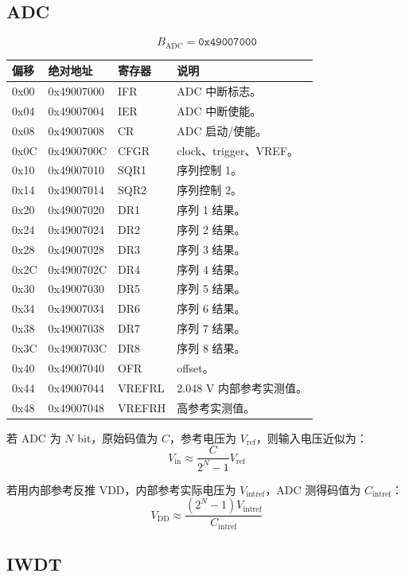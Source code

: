 \documentclass[UTF8,a4paper,11pt]{ctexart}
\newcommand{\addr}[1]{\texttt{#1}}
\begin{document}
\subsection{ADC}

\[
  B_{\mathrm{ADC}} = \addr{0x49007000}
\]

\begin{longtable}{>{\ttfamily}p{2cm}>{\ttfamily}p{3cm}p{2.5cm}p{6cm}}
\toprule
偏移 & 绝对地址 & 寄存器 & 说明 \\
\midrule
\endhead
0x00 & 0x49007000 & IFR & ADC 中断标志。\\
0x04 & 0x49007004 & IER & ADC 中断使能。\\
0x08 & 0x49007008 & CR & ADC 启动/使能。\\
0x0C & 0x4900700C & CFGR & clock、trigger、VREF。\\
0x10 & 0x49007010 & SQR1 & 序列控制 1。\\
0x14 & 0x49007014 & SQR2 & 序列控制 2。\\
0x20 & 0x49007020 & DR1 & 序列 1 结果。\\
0x24 & 0x49007024 & DR2 & 序列 2 结果。\\
0x28 & 0x49007028 & DR3 & 序列 3 结果。\\
0x2C & 0x4900702C & DR4 & 序列 4 结果。\\
0x30 & 0x49007030 & DR5 & 序列 5 结果。\\
0x34 & 0x49007034 & DR6 & 序列 6 结果。\\
0x38 & 0x49007038 & DR7 & 序列 7 结果。\\
0x3C & 0x4900703C & DR8 & 序列 8 结果。\\
0x40 & 0x49007040 & OFR & offset。\\
0x44 & 0x49007044 & VREFRL & 2.048 V 内部参考实测值。\\
0x48 & 0x49007048 & VREFRH & 高参考实测值。\\
\bottomrule
\end{longtable}

若 ADC 为 $N$ bit，原始码值为 $C$，参考电压为 $V_{\mathrm{ref}}$，则输入电压近似为：
\[
  V_{\mathrm{in}} \approx \frac{C}{2^N - 1} V_{\mathrm{ref}}
\]

若用内部参考反推 VDD，内部参考实际电压为 $V_{\mathrm{intref}}$，ADC 测得码值为 $C_{\mathrm{intref}}$：
\[
  V_{\mathrm{DD}}
  \approx
  \frac{(2^N - 1)V_{\mathrm{intref}}}{C_{\mathrm{intref}}}
\]

\subsection{IWDT}
\end{document}
